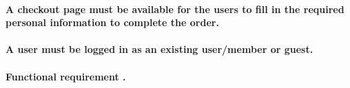 \documentclass{scrreprt}
\theoremstyle{funreq}
\begin{document}
	\paragraph[]{\normalfont A checkout page must be available for the users to fill in the required personal information to complete the order.}
	\paragraph[]{\normalfont A user must be logged in as an existing user/member or guest.}
	
	\paragraph[]{Functional requirement .}
\end{document}
